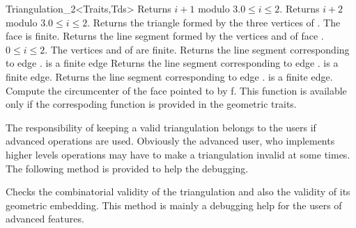 \begin{ccRefClass}{Triangulation_2<Traits,Tds>}
{Returns $i+1$ modulo 3.\ccPrecond $0\leq i \leq 2$.}
\ccGlue
{}
{Returns $i+2$ modulo 3.\ccPrecond $0\leq i \leq 2$.}
\ccGlue
{}
{Returns the triangle formed by the three vertices of .
 \ccPrecond The face is finite.}
\ccGlue
{}
{Returns the line segment formed by the vertices 
 and  of face .
\ccPrecond $0\leq i \leq 2$. The vertices 
 and  of  
 are finite.}
\ccGlue
{}
{Returns the line segment corresponding to edge .
\ccPrecond {} is a finite edge}
\ccGlue
{}
{Returns the line segment corresponding to edge .
\ccPrecond {} is a finite edge.}
\ccGlue
{}
{Returns the line segment corresponding to edge .
\ccPrecond {} is a finite edge.}
\ccGlue
{}
{Compute the circumcenter of the face pointed to by f. This function
is available only if the correspoding function is provided in the
geometric traits.}

\begin{ccAdvanced}

The responsibility of keeping a valid triangulation
belongs to the users if advanced operations are used.
Obviously the advanced user, who implements higher levels operations
may have to make a triangulation invalid at some times. The following
method is provided to help the debugging.

{Checks the combinatorial validity of the triangulation and
also the validity of its geometric embedding.
 This method is  mainly a debugging help
for the users of advanced features.
}
\end{ccAdvanced}



\end{ccRefClass}
